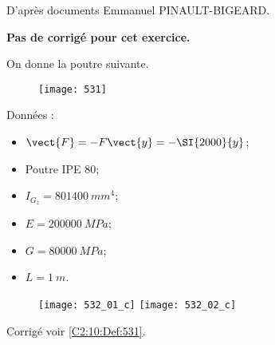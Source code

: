 \normaltrue
\correctionfalse


\setcounter{question}{0}

\begin{flushright}
\footnotesize{D'après documents Emmanuel PINAULT-BIGEARD.}
\end{flushright}


\ifcorrection
\else
\textbf{Pas de corrigé pour cet exercice.}
\fi

On donne la poutre suivante. 

\begin{figure}[H]
\centering
\texttt{[image: 531]}
\end{figure}

Données : 
\begin{itemize}
\item $\vect{F}=-F\vect{y}=-\SI{2000}{y}$;
\item Poutre IPE 80;
\item $I_{G_z} = \SI{801400}{mm^4}$;
\item $E = \SI{200000}{MPa}$;
\item $G = \SI{80000}{MPa}$;
\item $L= \SI{1}{m}$.
\end{itemize}

\ifprof
\else
\fi

\ifprof
\else
\fi



\ifprof
\begin{figure}[H]
\centering
\texttt{[image: 532\_01\_c]}
\texttt{[image: 532\_02\_c]}
\end{figure}
\else

\begin{flushright}
\footnotesize{Corrigé  voir \ref{C2:10:Def:531}.}
\end{flushright}%
\fi